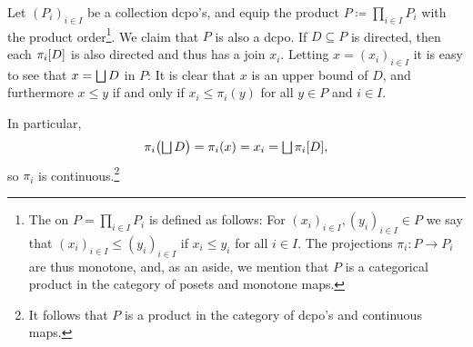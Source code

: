 \documentclass[a4paper, 11pt, article, danish, oneside]{memoir}
\DeclarePairedDelimiter{\auxdelimbracket}{[}{]}
\DeclareMathOperator*{\smallbigsqcup}{\textstyle\bigsqcup}
\DeclareMathOperator*{\bigdjoin}{\mathchoice
    {\smallbigsqcup}%
    {\bigsqcup}%
    {\bigsqcup}%
    {\bigsqcup}%
}
\newcommand{\defeq}{\coloneqq}
\newcommand{\image}[2][]{\auxdelimbracket[#1]{#2}}
\let\oldprod\prod
\renewcommand{\prod}{\times}
\newcommand{\bigprod}{\oldprod}
\begin{document}
\begin{examplebreak}
    Let $(P_i)_{i \in I}$ be a collection dcpo's, and equip the product $P \defeq \bigprod_{i \in I} P_i$ with the product order\footnote{The  on $P = \bigprod_{i \in I} P_i$ is defined as follows: For $(x_i)_{i \in I}, (y_i)_{i \in I} \in P$ we say that $(x_i)_{i \in I} \leq (y_i)_{i \in I}$ if $x_i \leq y_i$ for all $i \in I$. The projections $\pi_i \colon P \to P_i$ are thus monotone, and, as an aside, we mention that $P$ is a categorical product in the category of posets and monotone maps.}. We claim that $P$ is also a dcpo. If $D \subseteq P$ is directed, then each $\pi_i\image{D}$ is also directed and thus has a join $x_i$. Letting $x = (x_i)_{i \in I}$ it is easy to see that $x = \bigdjoin D$ in $P$: It is clear that $x$ is an upper bound of $D$, and furthermore $x \leq y$ if and only if $x_i \leq \pi_i(y)$ for all $y \in P$ and $i \in I$.

    In particular,
    \begin{equation*}
        \pi_i \bigl( \bigdjoin D \bigr)
            = \pi_i(x)
            = x_i
            = \bigdjoin \pi_i\image{D},
    \end{equation*}
    so $\pi_i$ is continuous.\footnote{It follows that $P$ is a product in the category of dcpo's and continuous maps.}
\end{examplebreak}
\end{document}
